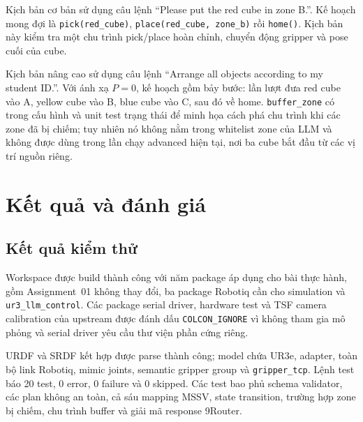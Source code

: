 \documentclass[12pt,a4paper]{article}
\begin{document}
Kịch bản cơ bản sử dụng câu lệnh ``Please put the red cube in zone B.''. Kế hoạch mong đợi là \texttt{pick(red\_cube)}, \texttt{place(red\_cube, zone\_b)} rồi \texttt{home()}. Kịch bản này kiểm tra một chu trình pick/place hoàn chỉnh, chuyển động gripper và pose cuối của cube.

Kịch bản nâng cao sử dụng câu lệnh ``Arrange all objects according to my student ID.''. Với ánh xạ $P=0$, kế hoạch gồm bảy bước: lần lượt đưa red cube vào A, yellow cube vào B, blue cube vào C, sau đó về home. \texttt{buffer\_zone} có trong cấu hình và unit test trạng thái để minh họa cách phá chu trình khi các zone đã bị chiếm; tuy nhiên nó không nằm trong whitelist zone của LLM và không được dùng trong lần chạy advanced hiện tại, nơi ba cube bắt đầu từ các vị trí nguồn riêng.

\section{Kết quả và đánh giá}

\subsection{Kết quả kiểm thử}

Workspace được build thành công với năm package áp dụng cho bài thực hành, gồm Assignment~01 không thay đổi, ba package Robotiq cần cho simulation và \texttt{ur3\_llm\_control}. Các package serial driver, hardware test và TSF camera calibration của upstream được đánh dấu \texttt{COLCON\_IGNORE} vì không tham gia mô phỏng và serial driver yêu cầu thư viện phần cứng riêng.

URDF và SRDF kết hợp được parse thành công; model chứa UR3e, adapter, toàn bộ link Robotiq, mimic joints, semantic gripper group và \texttt{gripper\_tcp}. Lệnh test báo 20 test, 0 error, 0 failure và 0 skipped. Các test bao phủ schema validator, các plan không an toàn, cả sáu mapping MSSV, state transition, trường hợp zone bị chiếm, chu trình buffer và giải mã response 9Router.
\end{document}
